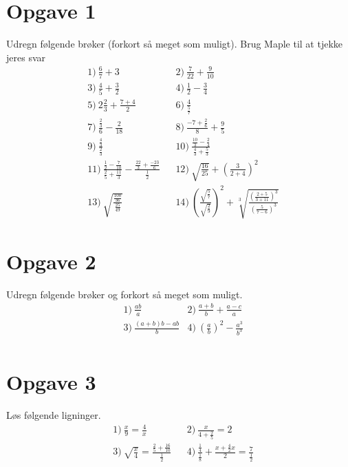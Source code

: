 \section*{Opgave 1}
Udregn følgende brøker (forkort så meget som muligt). Brug Maple til at tjekke jeres svar
\begin{align*}
	&1)\  \frac{6}{7} + 3              &&2)\ \frac{7}{22} + \frac{9}{10}\\
 	&3)\ \frac{4}{5} + \frac{3}{2}      &&4)\ \frac{1}{2} - \frac{3}{4}\\
 	&5)\  2\frac{2}{3} + \frac{7+4}{2}              &&6)\ \frac{4}{\frac{5}{7}}\\
 	&7)\  \frac{\frac{2}{3}}{6} - \frac{2}{18}           &&8)\ \frac{-7+\frac{2}{6}}{8} + \frac{9}{5}\\
	&9)\ \frac{\frac{4}{3}}{\frac{2}{3}} &&10)\ \frac{\frac{10}{3}-\frac{2}{4}}{\frac{4}{3}+\frac{5}{3}} \\
	&11)\  \frac{\frac{1}{2}-\frac{7}{10}}{\frac{2}{5}+\frac{11}{3}} -  \frac{\frac{22}{3}+ \frac{-23}{6}}{\frac{1}{2}}        &&12)\ \sqrt{\frac{16}{25}} + \left(\frac{3}{2+4}\right)^2\\
	&13)\ \sqrt{\frac{\frac{100}{36}}{\frac{25}{49}}} && 14) \   \left(\frac{\sqrt{\frac{5}{7}}}{\sqrt{\frac{2}{9}}}\right)^2 + \sqrt[3]{\frac{\left(\frac{2+5}{3+11}\right)^3}{\left( \frac{5}{7-6}\right)^3}}
\end{align*}

\section*{Opgave 2}
Udregn følgende brøker og forkort så meget som muligt. 
\begin{align*}
	&1) \ \frac{ab}{a}   &2) \  \frac{a+b}{b} + \frac{a-c}{a}    \\
	&3) \ \frac{(a+b)b-ab}{b}   &4) \  \left(\frac{a}{b}\right)^2 - \frac{a^3}{b^3}   \\
\end{align*}

\section*{Opgave 3}
Løs følgende ligninger.
\begin{align*}
	&1) \ \frac{x}{9} = \frac{4}{x}   &&2) \ \frac{x}{4+\frac{2}{5}} = 2     \\
	&3) \ \sqrt{\frac{x}{4}} = \frac{\frac{2}{5}+\frac{16}{10}}{\frac{1}{2}}    &&4) \ \frac{\frac{1}{4}}{\frac{1}{8}} + \frac{x+\frac{4}{2}x}{2} = \frac{7}{\frac{1}{2}}    \\
\end{align*}
